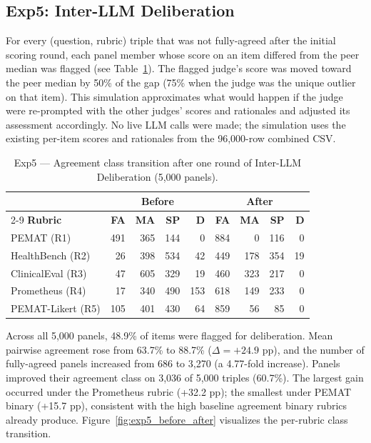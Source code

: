 \documentclass[conference]{IEEEtran}
\begin{document}
\subsection{Exp5: Inter-LLM Deliberation}

For every (question, rubric) triple that was not fully-agreed after
the initial scoring round, each panel member whose score on an item
differed from the peer median was flagged (see Table~\ref{tab:exp5}).
The flagged judge's score
was moved toward the peer median by 50\% of the gap (75\% when the
judge was the unique outlier on that item). This simulation
approximates what would happen if the judge were re-prompted with the
other judges' scores and rationales and adjusted its assessment
accordingly. No live LLM calls were made; the simulation uses the
existing per-item scores and rationales from the 96,000-row combined
CSV.

\begin{table}[htbp]
\caption{Exp5 --- Agreement class transition after one round of
Inter-LLM Deliberation (5,000 panels).}
\label{tab:exp5}
\begin{flushleft}
\small
\setlength{\tabcolsep}{3pt}
\begin{tabular}{|l|r|r|r|r|r|r|r|r|}
\hline
& \multicolumn{4}{c|}{\textbf{Before}} & \multicolumn{4}{c|}{\textbf{After}} \\
\cline{2-9}
\textbf{Rubric} & \textbf{FA} & \textbf{MA} & \textbf{SP} & \textbf{D} & \textbf{FA} & \textbf{MA} & \textbf{SP} & \textbf{D} \\
\hline
PEMAT (R1)        & 491 & 365 & 144 &   0 & 884 &   0 & 116 &  0 \\
HealthBench (R2)  &  26 & 398 & 534 &  42 & 449 & 178 & 354 & 19 \\
ClinicalEval (R3) &  47 & 605 & 329 &  19 & 460 & 323 & 217 &  0 \\
Prometheus (R4)   &  17 & 340 & 490 & 153 & 618 & 149 & 233 &  0 \\
PEMAT-Likert (R5) & 105 & 401 & 430 &  64 & 859 &  56 &  85 &  0 \\
\hline
\end{tabular}
\end{flushleft}
\end{table}

Across all 5,000 panels, 48.9\% of items were flagged for
deliberation. Mean pairwise agreement rose from 63.7\% to 88.7\%
($\Delta = +24.9$ pp), and the number of fully-agreed panels
increased from 686 to 3,270 (a 4.77-fold increase). Panels improved
their agreement class on 3,036 of 5,000 triples (60.7\%). The largest
gain occurred under the Prometheus rubric (+32.2 pp); the smallest
under PEMAT binary (+15.7 pp), consistent with the high baseline
agreement binary rubrics already produce. Figure~\ref{fig:exp5_before_after}
visualizes the per-rubric class transition.
\end{document}
